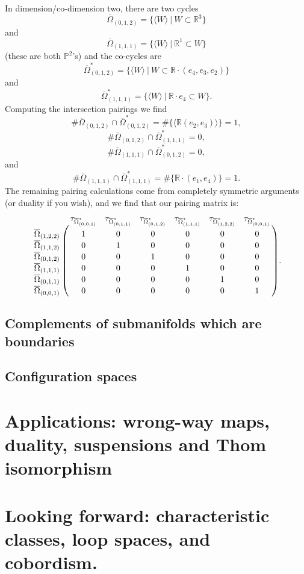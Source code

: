 \documentclass{amsart}          %
\begin{document}
In dimension/co-dimension two, there are two cycles
\[
\overline{\Omega}_{(0,1,2)} = \lbrace \langle W\rangle \ | \ W\subset \mathbb{R}^3\rbrace
\]
and
\[
\overline{\Omega}_{(1, 1, 1)} = \lbrace \langle W \rangle \ | \ \mathbb{R}^1\subset W\rbrace
\]
(these are both $\mathbb{P}^2$'s) and the co-cycles are
\[
\overline{\Omega}_{(0,1,2)}^{\ast} = \lbrace \langle W \rangle \ | \ W\subset \mathbb{R}\cdot (e_4, e_3, e_2)\rbrace
\]
and
\[
\overline{\Omega}_{(1, 1, 1)}^{\ast} = \lbrace \langle W\rangle \ | \ \mathbb{R}\cdot e_4\subset W\rbrace. 
\]
Computing the intersection pairings we find
\[
\#\overline{\Omega}_{(0,1,2)}\cap \overline{\Omega}_{(0,1,2)}^{\ast} =\# \lbrace\langle \mathbb{R}(e_2, e_3)\rangle \rbrace = 1,
\]
\[
\# \overline{\Omega}_{(0, 1, 2)}\cap \overline{\Omega}_{(1, 1, 1)}^{\ast} = 0, 
\]
\[
\#\overline{\Omega}_{(1, 1, 1)}\cap \overline{\Omega}_{(0, 1, 2)}^{\ast} = 0,
\]
and
\[
\#\overline{\Omega}_{(1, 1, 1)}\cap \overline{\Omega}_{(1, 1, 1)}^{\ast} = \#\lbrace \mathbb{R}\cdot (e_1, e_4)\rbrace = 1.
\]
The remaining pairing calculations come from completely symmetric arguments (or duality if you wish), and we find that our pairing matrix is:
\[
\bordermatrix{&\tau_{\overline{\Omega}_{(0, 0, 1)}^{\ast}}&\tau_{\overline{\Omega}_{(0, 1, 1)}^{\ast}}&\tau_{\overline{\Omega}_{(0, 1, 2)}^{\ast}} &\tau_{\overline{\Omega}_{(1, 1, 1)}^{\ast}}&\tau_{\overline{\Omega}_{(1, 2, 2)}^{\ast}}&\tau_{\overline{\Omega}_{(0, 0, 1)}^{\ast}}\cr
                \overline{\Omega}_{(1, 2, 2)}&1 &  0  & 0 & 0 & 0 & 0 \cr
                \overline{\Omega}_{(1, 1, 2)}&0 &  1  & 0 & 0 & 0 & 0 \cr
               \overline{\Omega}_{(0, 1, 2)}&0 &  0  & 1 & 0 & 0 & 0 \cr
                \overline{\Omega}_{(1, 1, 1)}&0 &  0  & 0& 1 & 0 & 0 \cr
                \overline{\Omega}_{(0, 1, 1)}&0 &  0  & 0 & 0 & 1 & 0 \cr
                \overline{\Omega}_{(0, 0, 1)}&0 &  0  & 0 & 0 & 0 & 1 \cr}.
\] 

\subsection{Complements of submanifolds which are boundaries}

\subsection{Configuration spaces}

\section{Applications: wrong-way maps, duality, suspensions and Thom isomorphism}

\section{Looking forward: characteristic classes, loop spaces, and cobordism.}

\nocite{*}


\printindex
\end{document}
